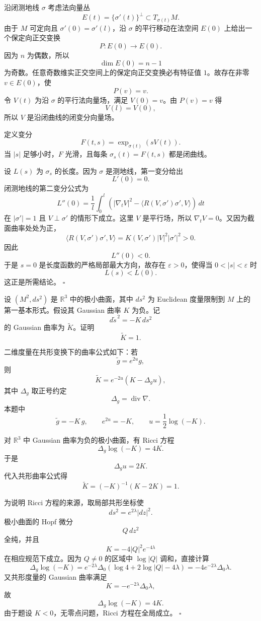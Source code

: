 \documentclass[UTF8,12pt]{ctexart}
\newcommand{\R}{\mathbb R}
\newcounter{problem}
\newenvironment{problem}[1][]{%
  \refstepcounter{problem}
  \par\bigskip
  \noindent{\large\bfseries 题目 \theproblem\if\relax\detokenize{#1}\relax\else\quad #1\fi}\par
  \smallskip
  \noindent\ignorespaces
}{\par}
\newenvironment{solution}{%
  \par\medskip
  \noindent{\bfseries 解答}\quad\ignorespaces
}{\hfill$\square$\par\medskip}
\begin{document}
\begin{solution}
沿闭测地线 \(\sigma\) 考虑法向量丛
\[
E(t)=\{\sigma'(t)\}^{\perp}\subset T_{\sigma(t)}M.
\]
由于 \(M\) 可定向且 \(\sigma'(0)=\sigma'(l)\)，沿 \(\sigma\) 的平行移动在法空间 \(E(0)\) 上给出一个保定向正交变换
\[
P:E(0)\to E(0).
\]
因为 \(n\) 为偶数，所以
\[
\dim E(0)=n-1
\]
为奇数。任意奇数维实正交空间上的保定向正交变换必有特征值 \(1\)。故存在非零 \(v\in E(0)\)，使
\[
P(v)=v.
\]
令 \(V(t)\) 为沿 \(\sigma\) 的平行法向量场，满足 \(V(0)=v\)。由 \(P(v)=v\) 得
\[
V(l)=V(0),
\]
所以 \(V\) 是沿闭曲线的闭变分向量场。

定义变分
\[
F(t,s)=\exp_{\sigma(t)}(sV(t)).
\]
当 \(|s|\) 足够小时，\(F\) 光滑，且每条 \(\sigma_s(t)=F(t,s)\) 都是闭曲线。

设 \(L(s)\) 为 \(\sigma_s\) 的长度。因为 \(\sigma\) 是测地线，第一变分给出
\[
L'(0)=0.
\]
闭测地线的第二变分公式为
\[
L''(0)=\frac1l\int_0^l
\left(|\nabla_tV|^2-\langle R(V,\sigma')\sigma',V\rangle\right)\,dt
\]
在 \(|\sigma'|=1\) 且 \(V\perp\sigma'\) 的情形下成立。这里 \(V\) 是平行场，所以 \(\nabla_tV=0\)。又因为截面曲率处处为正，
\[
\langle R(V,\sigma')\sigma',V\rangle
=K(V,\sigma')|V|^2|\sigma'|^2>0.
\]
因此
\[
L''(0)<0.
\]
于是 \(s=0\) 是长度函数的严格局部最大方向，故存在 \(\varepsilon>0\)，使得当 \(0<|s|<\varepsilon\) 时
\[
L(s)<L(0).
\]
这正是所需结论。
\end{solution}

\begin{problem}
设 \((M^2,ds^2)\) 是 \(\R^3\) 中的极小曲面，其中 \(ds^2\) 为 Euclidean 度量限制到 \(M\) 上的第一基本形式。假设其 Gaussian 曲率 \(K\) 为负。记
\[
d\widetilde s^{\,2}=-K\,ds^2
\]
的 Gaussian 曲率为 \(\widetilde K\)。证明
\[
\widetilde K=1.
\]
\end{problem}

\begin{solution}
二维度量在共形变换下的曲率公式如下：若
\[
\widetilde g=e^{2u}g,
\]
则
\[
\widetilde K=e^{-2u}(K-\Delta_g u),
\]
其中 \(\Delta_g\) 取正号约定
\[
\Delta_g=\operatorname{div}\nabla.
\]
本题中
\[
\widetilde g=-K\,g,
\qquad
e^{2u}=-K,
\qquad
u=\frac12\log(-K).
\]

对 \(\R^3\) 中 Gaussian 曲率为负的极小曲面，有 Ricci 方程
\[
\Delta_g\log(-K)=4K.
\]
于是
\[
\Delta_g u=2K.
\]
代入共形曲率公式得
\[
\widetilde K
=(-K)^{-1}(K-2K)
=1.
\]

为说明 Ricci 方程的来源，取局部共形坐标使
\[
ds^2=e^{2\lambda}|dz|^2.
\]
极小曲面的 Hopf 微分
\[
Q\,dz^2
\]
全纯，并且
\[
K=-4|Q|^2e^{-4\lambda}
\]
在相应规范下成立。因为 \(Q\ne0\) 的区域中 \(\log|Q|\) 调和，直接计算
\[
\Delta_g\log(-K)
=e^{-2\lambda}\Delta_0(\log 4+2\log|Q|-4\lambda)
=-4e^{-2\lambda}\Delta_0\lambda.
\]
又共形度量的 Gaussian 曲率满足
\[
K=-e^{-2\lambda}\Delta_0\lambda,
\]
故
\[
\Delta_g\log(-K)=4K.
\]
由于题设 \(K<0\)，无零点问题，Ricci 方程在全局成立。
\end{solution}
\end{document}
